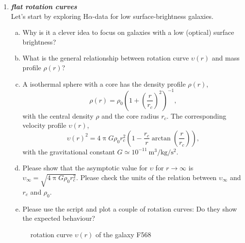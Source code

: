 \documentclass[a4paper,12pt]{article}
\newcommand{\question}[1]{\textbf{\textit{#1}}}
\renewcommand{\pi}{\uppi}
\begin{document}
\begin{enumerate}

\item \question{flat rotation curves}\\
Let's start by exploring H$\alpha$-data for low surface-brightness galaxies.
\begin{enumerate}[(a)]
\item{Why is it a clever idea to focus on galaxies with a low (optical) surface brightness?}
\item{What is the general relationship between rotation curve $\upsilon(r)$ and mass profile $\rho(r)$?}
\item{A isothermal sphere with a core has the density profile $\rho(r)$,
\begin{equation}
\rho(r) = \rho_0\left(1+\left(\frac{r}{r_c}\right)^2\right)^{-1},
\end{equation}
with the central density $\rho$ and the core radius $r_c$. The corresponding velocity profile $\upsilon(r)$,
\begin{equation}
\upsilon(r)^2 = 4\pi G\rho_0 r_c^2\left(1-\frac{r_c}{r}\arctan\left(\frac{r}{r_c}\right)\right),
\end{equation}
with the gravitational constant $G\simeq 10^{-11}~\mathrm{m}^3/\mathrm{kg}/\mathrm{s}^2$.}
\item{Please show that the asymptotic value for $\upsilon$ for $r\rightarrow\infty$ is $\upsilon_\infty = \sqrt{4\pi G\rho_0r_c^2}$. Please check the units of the relation between $\upsilon_\infty$ and $r_c$ and $\rho_0$.}
\item{Please use the script  and plot a couple of rotation curves: Do they show the expected behaviour?}
\end{enumerate}

\begin{figure}[h]
\begin{center}
\caption{rotation curve $\upsilon(r)$ of the galaxy F568}
\end{center}
\end{figure}


\end{enumerate}
\end{document}
